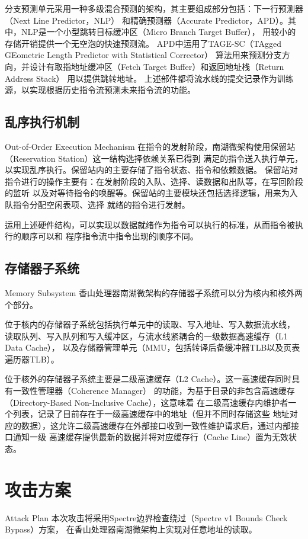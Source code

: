 分支预测单元采用一种多级混合预测的架构，其主要组成部分包括：下一行预测器（Next Line Predictor，NLP）
和精确预测器（Accurate Predictor，APD）。其中，NLP是一个小型跳转目标缓冲区（Micro Branch Target Buffer），
用较小的存储开销提供一个无空泡的快速预测流。
APD中运用了TAGE-SC（TAgged GEometric Length Predictor with Statistical Corrector）
算法用来预测分支方向，并设计有取指地址缓冲区（Fetch Target Buffer）和返回地址栈（Return Address Stack）
用以提供跳转地址。
上述部件都将流水线的提交记录作为训练源，以实现根据历史指令流预测未来指令流的功能。

\subsection{乱序执行机制}{Out-of-Order Execution Mechanism}
在指令的发射阶段，南湖微架构使用保留站（Reservation Station）这一结构选择依赖关系已得到
满足的指令送入执行单元，以实现乱序执行。保留站内的主要存储了指令状态、指令和依赖数据。
保留站对指令进行的操作主要有：在发射阶段的入队、选择、读数据和出队等，在写回阶段的监听
以及对等待指令的唤醒等。保留站的主要模块还包括选择逻辑，用来为入队指令分配空闲表项、选择
就绪的指令进行发射。

运用上述硬件结构，可以实现以数据就绪作为指令可以执行的标准，从而指令被执行的顺序可以和
程序指令流中指令出现的顺序不同。

\subsection{存储器子系统}{Memory Subsystem}
香山处理器南湖微架构的存储器子系统可以分为核内和核外两个部分。

位于核内的存储器子系统包括执行单元中的读取、写入地址、写入数据流水线，
读取队列、写入队列和写入缓冲区，与流水线紧耦合的一级数据高速缓存（L1 Data Cache），
以及存储器管理单元（MMU，包括转译后备缓冲器TLB以及页表遍历器TLB）。

位于核外的存储器子系统主要是二级高速缓存（L2 Cache）。这一高速缓存同时具有一致性管理器（Coherence Manager）
的功能，为基于目录的非包含高速缓存（Directory-Based Non-Inclusive Cache），这意味着
在二级高速缓存内维护者一个列表，记录了目前存在于一级高速缓存中的地址（但并不同时存储这些
地址对应的数据），这允许二级高速缓存在外部接口收到一致性维护请求后，通过内部接口通知一级
高速缓存提供最新的数据并将对应缓存行（Cache Line）置为无效状态。


\section{攻击方案}{Attack Plan}
本次攻击将采用Spectre边界检查绕过（Spectre v1 Bounds Check Bypass）\cite{kocher_spectre_2019}方案，
在香山处理器南湖微架构上实现对任意地址的读取。

